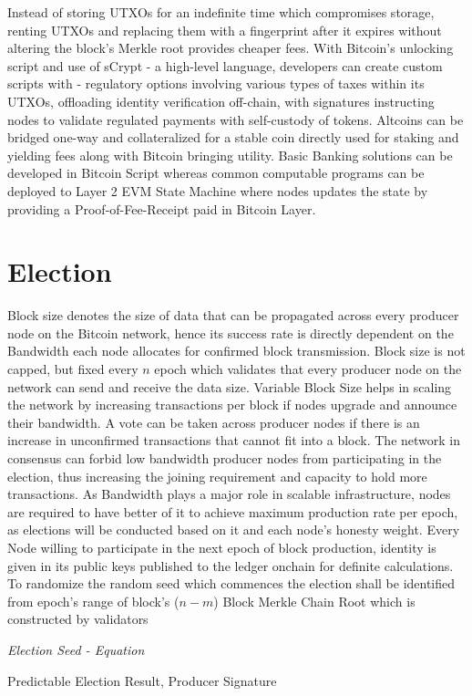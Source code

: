 \documentclass[a4paper,10pt]{article}
\begin{document}
Instead of storing UTXOs for an indefinite time which compromises storage, renting UTXOs and replacing them with a fingerprint after it expires without altering the block's Merkle root provides cheaper fees. With Bitcoin's unlocking script and use of sCrypt - a high-level language, developers can create custom scripts with - regulatory options involving various types of taxes within its UTXOs, offloading identity verification off-chain, with signatures instructing nodes to validate regulated payments with self-custody of tokens. Altcoins can be bridged one-way and collateralized for a stable coin directly used for staking and yielding fees along with Bitcoin bringing utility. Basic Banking solutions can be developed in Bitcoin Script whereas common computable programs can be deployed to Layer 2 EVM State Machine where nodes updates the state by providing a Proof-of-Fee-Receipt paid in Bitcoin Layer. 
\section{Election}
Block size denotes the size of data that can be propagated across every producer node on the Bitcoin network, hence its success rate is directly dependent on the Bandwidth each node allocates for confirmed block transmission. Block size is not capped, but fixed every $n$ epoch which validates that every producer node on the network can send and receive the data size. Variable Block Size helps in scaling the network by increasing transactions per block if nodes upgrade and announce their bandwidth. A vote can be taken across producer nodes if there is an increase in unconfirmed transactions that cannot fit into a block. The network in consensus can forbid low bandwidth producer nodes from participating in the election, thus increasing the joining requirement and capacity to hold more transactions. As Bandwidth plays a major role in scalable infrastructure, nodes are required to have better of it to achieve maximum production rate per epoch, as elections will be conducted based on it and each node's honesty weight. Every Node willing to participate in the next epoch of block production, identity is given in its public keys published to the ledger onchain for definite calculations. To randomize the random seed which commences the election shall be identified from epoch's range of block's ($n-m$) Block Merkle Chain Root which is constructed by validators

\textit{Election Seed - Equation}

Predictable Election Result, Producer Signature
\end{document}
